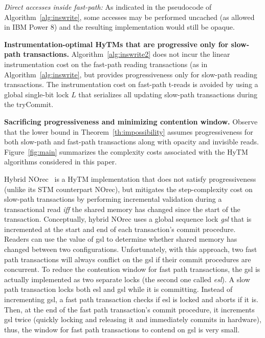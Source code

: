 \vspace{1mm}\noindent\textit{Direct accesses inside fast-path:}
As indicated in the pseudocode of Algorithm~\ref{alg:inswrite}, some accesses may be performed uncached (as allowed
in IBM Power 8) and the resulting implementation would still be opaque.

\vspace{1mm}\noindent\textbf{Instrumentation-optimal HyTMs that are progressive only for slow-path transactions.}
Algorithm~\ref{alg:inswrite2} does not incur the linear instrumentation cost
on the fast-path reading transactions (as in Algorithm~\ref{alg:inswrite}, but provides progressiveness only
for slow-path reading transactions. 
The instrumentation cost on fast-path t-reads is avoided by using a global single-bit lock $L$ that serializes all updating slow-path transactions
during the tryCommit.%

\vspace{1mm}\noindent\textbf{Sacrificing progressiveness and minimizing contention window.}
Observe that the lower bound in Theorem~\ref{th:impossibility} assumes progressiveness for both slow-path and fast-path transactions
along with opacity and invisible reads.
Figure~\ref{fig:main} summarizes the complexity costs
associated with the HyTM algorithms considered in this paper.

Hybrid NOrec~\cite{hybridnorec} is a HyTM implementation that does not satisfy progressiveness
(unlike its STM counterpart NOrec), but mitigates
the step-complexity cost on slow-path transactions by performing incremental validation 
during a transactional read \emph{iff} 
the shared memory has changed since the start of the transaction.
Conceptually, hybrid NOrec uses a global sequence lock \emph{gsl} that is incremented 
at the start and end of each transaction's commit procedure.
Readers can use the value of gsl to determine whether shared memory has changed between two configurations.
Unfortunately, with this approach, two fast path transactions will always conflict on the gsl if their 
commit procedures are concurrent.
To reduce the contention window for fast path transactions, the gsl is actually implemented as two separate locks (the second one called \emph{esl}).
A slow path transaction locks both esl and gsl while it is committing.
Instead of incrementing gsl, a fast path transaction checks if esl is locked and aborts if it is.
Then, at the end of the fast path transaction's commit procedure, 
it increments gsl twice (quickly locking and releasing it and immediately commits in hardware), thus, the 
window for fast path transactions to contend on gsl is very small.
%
%